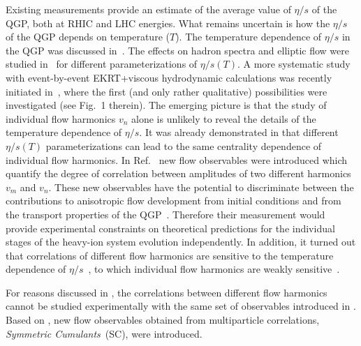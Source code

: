Existing measurements provide an estimate of the average value of $\eta/s$ of the QGP, both at RHIC and LHC energies. What remains uncertain is how the $\eta/s$ of the QGP depends on temperature ($T$). The temperature dependence of $\eta/s$ in the QGP was discussed in~\cite{Csernai:2006zz}. The effects on hadron spectra and elliptic flow were studied in~\cite{Niemi:2011ix} for different parameterizations of $\eta/s(T)$.  A more systematic study with event-by-event EKRT+viscous hydrodynamic calculations was recently initiated in~\cite{Niemi:2015qia}, where the first (and only rather qualitative) possibilities were investigated (see Fig.~1 therein). The emerging picture is that the study of individual flow harmonics $v_n$ alone is unlikely to reveal the details of the temperature dependence of $\eta/s$.
It was already demonstrated in \cite{Niemi:2015qia} that different $\eta/s(T)$ parameterizations can lead to the same centrality dependence of individual flow harmonics. In Ref.~\cite{Niemi:2012aj} new flow observables were introduced which quantify the degree of correlation between amplitudes of two different harmonics $v_m$ and $v_n$. These new observables have the potential to discriminate between the contributions to anisotropic flow development from initial conditions and from the transport properties of the QGP~\cite{Niemi:2012aj}. Therefore their measurement would provide experimental constraints on theoretical predictions for the individual stages of the heavy-ion system evolution independently. In addition, it turned out that correlations of different flow harmonics are sensitive to the temperature dependence of $\eta/s$~\cite{ALICE:2016kpq}, to which individual flow harmonics are weakly sensitive~\cite{Niemi:2015qia}. 
 
For reasons discussed in \cite{ALICE:2016kpq,Bilandzic:2013kga}, the correlations between different flow harmonics cannot be studied experimentally with the same set of observables introduced in \cite{Niemi:2012aj}. 
Based on \cite{Bilandzic:2013kga}, new flow observables obtained from multiparticle correlations, \textit{Symmetric Cumulants}~(SC), were introduced. 


